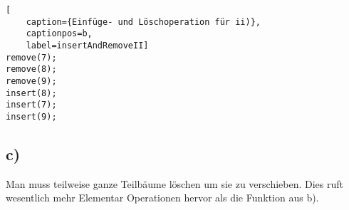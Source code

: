 \documentclass[a4paper]{article}
\begin{document}
\begin{lstlisting}[
	caption={Einfüge- und Löschoperation für ii)},
	captionpos=b,
	label=insertAndRemoveII]
remove(7);
remove(8);
remove(9);
insert(8);
insert(7);
insert(9);
\end{lstlisting}

\subsection*{c)}

Man muss teilweise ganze Teilbäume löschen um sie zu verschieben. Dies
ruft wesentlich mehr Elementar Operationen hervor als die Funktion aus
b).
\end{document}
